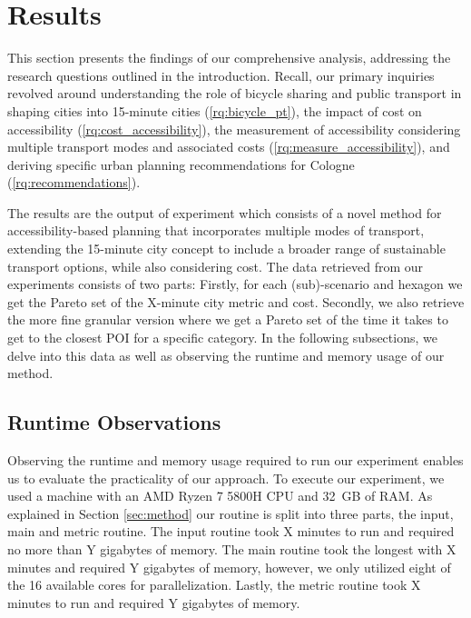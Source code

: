 \clearpage
\section{Results}
\label{sec:results}

This section presents the findings of our comprehensive analysis, addressing the research questions outlined in the introduction.
Recall, our primary inquiries revolved around understanding the role of bicycle sharing and public transport in shaping cities into 15-minute cities (\ref{rq:bicycle_pt}), the impact of cost on accessibility (\ref{rq:cost_accessibility}), the measurement of accessibility considering multiple transport modes and associated costs (\ref{rq:measure_accessibility}), and deriving specific urban planning recommendations for Cologne (\ref{rq:recommendations}).

The results are the output of experiment which consists of a novel method for accessibility-based planning that incorporates multiple modes of transport, extending the 15-minute city concept to include a broader range of sustainable transport options, while also considering cost.
The data retrieved from our experiments consists of two parts:
Firstly, for each (sub)-scenario and hexagon we get the Pareto set of the X-minute city metric and cost.
Secondly, we also retrieve the more fine granular version where we get a Pareto set of the time it takes to get to the closest POI for a specific category.
In the following subsections, we delve into this data as well as observing the runtime and memory usage of our method.



\subsection{Runtime Observations}
\label{subsec:runtime_observations}

Observing the runtime and memory usage required to run our experiment enables us to evaluate the practicality of our approach.
To execute our experiment, we used a machine with an AMD Ryzen 7 5800H CPU and 32 GB of RAM.
As explained in Section \ref{sec:method} our routine is split into three parts, the input, main and metric routine.
The input routine took X minutes to run and required no more than Y gigabytes of memory.
The main routine took the longest with X minutes and required Y gigabytes of memory, however, we only utilized eight of the 16 available cores for parallelization.
Lastly, the metric routine took X minutes to run and required Y gigabytes of memory.

